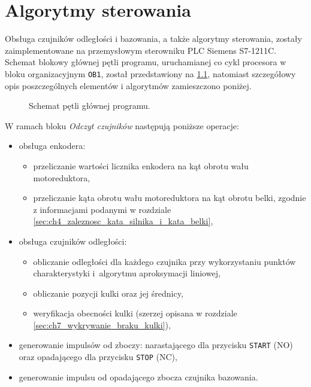 \chapter{Algorytmy sterowania}
\label{cha:ch7_algorytmy_sterowania}

Obsługa czujników odległości i bazowania, a także algorytmy sterowania, zostały zaimplementowane na przemysłowym sterowniku PLC Siemens S7-1211C. Schemat blokowy głównej pętli programu, uruchamianej co cykl procesora w bloku organizacyjnym \texttt{OB1}, został przedstawiony na \cref{fig:schemat_petla_glowna_PLC}, natomiast szczegółowy opis poszczególnych elementów i algorytmów zamieszczono poniżej.

\begin{figure}[ht]
    \centering
    
    
    \caption{Schemat pętli głównej programu.}
    \label{fig:schemat_petla_glowna_PLC}
\end{figure}

W ramach bloku \textit{Odczyt czujników} następują poniższe operacje:
\begin{itemize}
    \item obsługa enkodera:
    \begin{itemize}
        \item przeliczanie wartości licznika enkodera na kąt obrotu wału motoreduktora,
        \item przeliczanie kąta obrotu wału motoreduktora na kąt obrotu belki, zgodnie z informacjami podanymi w rozdziale \ref{sec:ch4_zaleznosc_kata_silnika_i_kata_belki},
    \end{itemize}
    \item obsługa czujników odległości:
    \begin{itemize}
        \item obliczanie odległości dla każdego czujnika przy wykorzystaniu punktów charakterystyki i~algorytmu aproksymacji liniowej,
        \item obliczanie pozycji kulki oraz jej średnicy,
        \item weryfikacja obecności kulki (szerzej opisana w rozdziale \ref{sec:ch7_wykrywanie_braku_kulki}),
    \end{itemize}
    \item generowanie impulsów od zboczy: narastającego dla przycisku \texttt{START} (NO) oraz opadającego dla przycisku \texttt{STOP} (NC),
    \item generowanie impulsu od opadającego zbocza czujnika bazowania.
\end{itemize}

